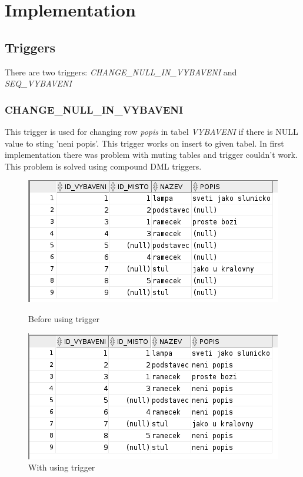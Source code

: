 \documentclass[12pt,a4paper]{article}
\begin{document}
\section{Implementation}

\subsection{Triggers}

There are two triggers: \textit{CHANGE\_NULL\_IN\_VYBAVENI} and 
\textit{SEQ\_VYBAVENI}

\subsubsection{CHANGE\_NULL\_IN\_VYBAVENI}

This trigger is used for changing row \textit{popis} in tabel \textit{VYBAVENI} 
if there is NULL value to sting 'neni popis'. This trigger works on insert to 
given tabel. In first implementation there was problem with muting tables and 
trigger couldn't work. This problem is solved using compound DML triggers.
\begin{figure}[h!]
    \centering
        \includegraphics[width=\textwidth,height=\textheight,keepaspectratio]{select_wt.png}
        \caption{Before using trigger}
        
        \includegraphics[width=\textwidth,height=\textheight,keepaspectratio]{select_update.png}
        \caption{With using trigger}
\end{figure}
\end{document}
